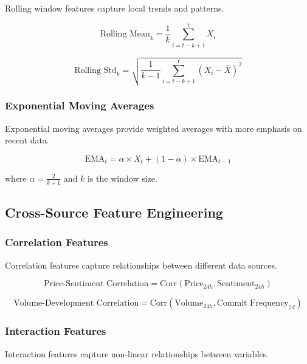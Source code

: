 \documentclass[12pt,a4paper]{article}
\begin{document}
Rolling window features capture local trends and patterns.

\begin{equation}
\text{Rolling Mean}_k = \frac{1}{k} \sum_{i=t-k+1}^{t} X_i
\end{equation}

\begin{equation}
\text{Rolling Std}_k = \sqrt{\frac{1}{k-1} \sum_{i=t-k+1}^{t} (X_i - \bar{X})^2}
\end{equation}

\subsubsection{Exponential Moving Averages}

Exponential moving averages provide weighted averages with more emphasis on recent data.

\begin{equation}
\text{EMA}_t = \alpha \times X_t + (1-\alpha) \times \text{EMA}_{t-1}
\end{equation}

where $\alpha = \frac{2}{k+1}$ and $k$ is the window size.

\subsection{Cross-Source Feature Engineering}

\subsubsection{Correlation Features}

Correlation features capture relationships between different data sources.

\begin{equation}
\text{Price-Sentiment Correlation} = \text{Corr}(\text{Price}_{24h}, \text{Sentiment}_{24h})
\end{equation}

\begin{equation}
\text{Volume-Development Correlation} = \text{Corr}(\text{Volume}_{24h}, \text{Commit Frequency}_{7d})
\end{equation}

\subsubsection{Interaction Features}

Interaction features capture non-linear relationships between variables.
\end{document}
